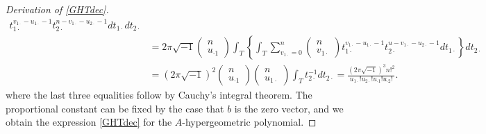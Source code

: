 \documentclass[a4paper,12pt]{article}
\theoremstyle{plain}
\theoremstyle{remark}
\begin{document}
\begin{proof}[Derivation of \eqref{GHTdec}]
\begin{align*}
    t_{1\cdot}^{v_{1\cdot}-u_{1\cdot}-1}
    t_{2\cdot}^{n-v_{1\cdot}-u_{2\cdot}-1}dt_{1\cdot}dt_{2\cdot}\\
    &=2\pi\sqrt{-1}\left(\begin{array}{c}n\\u_{\cdot1}\end{array}
    \right)
    \int_{T}\left\{\int_{T}
    \sum_{v_{1\cdot}=0}^n
    \left(\begin{array}{c}n\\v_{1\cdot}\end{array}\right)
    t_{1\cdot}^{v_{1\cdot}-u_{1\cdot}-1}
    t_{2\cdot}^{u-v_{1\cdot}-u_{2\cdot}-1}dt_{1\cdot}\right\}
    dt_{2\cdot}\\
    &=(2\pi\sqrt{-1})^2
    \left(\begin{array}{c}n\\u_{\cdot1}\end{array}\right)
    \left(\begin{array}{c}n\\u_{1\cdot}\end{array}\right)
    \int_{T}t_{2\cdot}^{-1}dt_{2\cdot}
    =\frac{(2\pi\sqrt{-1})^3n!^2}
    {u_{1\cdot}!u_{2\cdot}!u_{\cdot1}!u_{\cdot2}!}.
  \end{align*}
  where the last three equalities follow by Cauchy's integral
  theorem. The proportional constant can be fixed by the case
  that $b$ is the zero vector, and we obtain
  the expression \eqref{GHTdec} for the $A$-hypergeometric polynomial.
\end{proof}  
\end{document}
